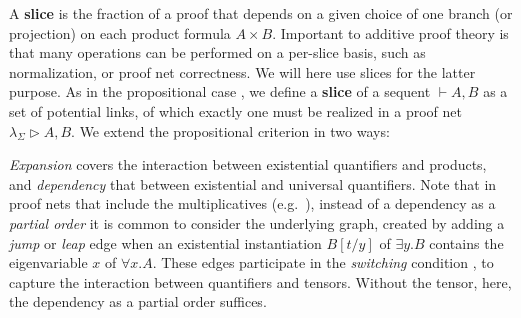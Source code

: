 \documentclass[a4paper,UKenglish]{lipics-v2019}
\makeatletter
\newcommand\defn[1]{\textbf{#1}}
\newcommand\+{+}
\renewcommand\*{\times}
\newcommand\seq[2]{{\vdash}#1,#2}
\newcommand\fv{\textsc{fv}}
\newcommand\Seq{\vphantom(\seq}
\newcommand\net[3]{#1\triangleright #2,#3}
\newcommand\Qrr{\!\!\scriptstyle\qrr}
\newcommand\qrr[1]{
  \ifx#1+\expandafter\@qrr\else
  \ifx#1*\*\mathrm R\else
  \ifx#1!\forall\mathrm R\else
  \ifx#1?\expandafter\@@qrr\else
  \ifx#11\mathrm{ax}\else
  \ifx#1.\mathrm{cut}\else
  #1\mathrm R
  \fi\fi\fi\fi\fi\fi
}
\newcommand\@qrr[1]{+\mathrm R,#1}
\newcommand\@@qrr[1]{\exists\mathrm R,#1}
\makeatother
\begin{document}
A \defn{slice} is the fraction of a proof that depends on a given choice of one branch (or projection) on each product formula $A\*B$. Important to additive proof theory is that many operations can be performed on a per-slice basis, such as normalization, or proof net correctness. We will here use slices for the latter purpose. As in the propositional case \cite{Hughes-vanGlabbeek-2005}, we define a \defn{slice} of a sequent $\seq AB$ as a set of potential links, of which exactly one must be realized in a proof net $\net{\lambda_\Sigma}AB$. We extend the propositional criterion in two ways:

%
\noindent
\emph{Expansion} covers the interaction between existential quantifiers and products, and \emph{dependency} that between existential and universal quantifiers. Note that in proof nets that include the multiplicatives (e.g.\ \cite{Girard-1996,Hughes-2018}), instead of a dependency as a \emph{partial order} it is common to consider the underlying graph, created by adding a \emph{jump} or \emph{leap} edge when an existential instantiation $B[t/y]$ of $\exists y.B$ contains the eigenvariable $x$ of $\forall x.A$. These edges participate in the \emph{switching} condition \cite{Danos-Regnier-1989}, to capture the interaction between quantifiers and tensors. Without the tensor, here, the dependency as a partial order suffices.
\end{document}
